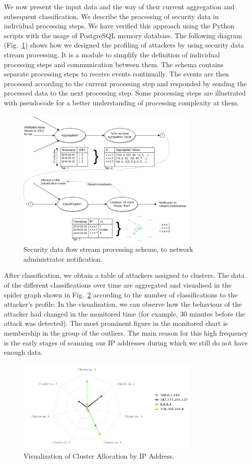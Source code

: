 \documentclass[conference, a4paper]{IEEEtran}
\begin{document}
We now present the input data and the way of their current aggregation and subsequent classification. We describe the processing of security data in individual processing steps. We have verified this approach using the Python scripts with the usage of PostgreSQL memory database. The following diagram (Fig.~\ref{fig1}) shows how we designed the profiling of attackers by using security data stream processing. It is a module to simplify the definition of individual processing steps and communication between them. The schema contains separate processing steps to receive events continually. The events are then processed according to the current processing step and responded by sending the processed data to the next processing step. Some processing steps are illustrated with pseudocode for a better understanding of processing complexity at them. 

\begin{figure}[htbp]
\centerline{\includegraphics[width=9cm]{images/main-scheme.png}}
\caption{Security data flow stream processing scheme, to network administrator notification.} 
\label{fig1}
\end{figure}

After classification, we obtain a table of attackers assigned to clusters. The data of the different classifications over time are aggregated and visualised in the spider graph shown in Fig.~\ref{fig2} according to the number of classifications to the attacker's profile. In the visualisation, we can observe how the behaviour of the attacker had changed in the monitored time (for example, 30 minutes before the attack was detected). The most prominent figure in the monitored chart is membership in the group of the outliers. The main reason for this high frequency is the early stages of scanning our IP addresses during which we still do not have enough data.

\begin{figure}[htbp]
\centerline{\includegraphics[width=9cm]{images/cluster-ip.png}}
\caption{Visualization of Cluster Allocation by IP Address.}
\label{fig2}
\end{figure}
\end{document}

